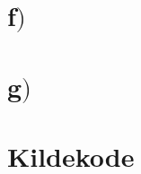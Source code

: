 \documentclass{article}
\begin{document}
\section*{f$)$}

\section*{g$)$}

\section*{Kildekode}
\hypertarget{sourcecode}{}

\end{document}
